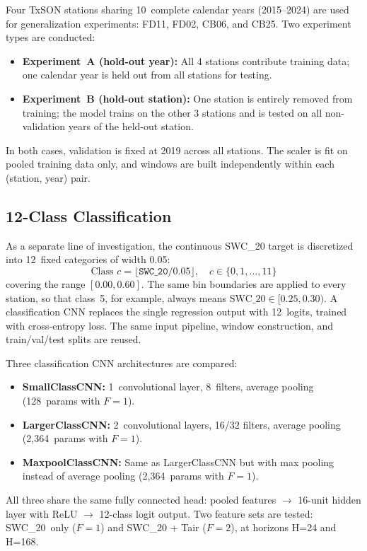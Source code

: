 \documentclass[11pt]{article}
\begin{document}
Four TxSON stations sharing 10~complete calendar years (2015--2024) are used for
generalization experiments: FD11, FD02, CB06, and CB25. Two experiment types are
conducted:
\begin{itemize}
    \item \textbf{Experiment~A (hold-out year):} All 4 stations contribute training
    data; one calendar year is held out from all stations for testing.
    \item \textbf{Experiment~B (hold-out station):} One station is entirely removed
    from training; the model trains on the other 3 stations and is tested on all
    non-validation years of the held-out station.
\end{itemize}
In both cases, validation is fixed at 2019 across all stations. The scaler is fit on
pooled training data only, and windows are built independently within each
(station, year) pair.

\subsection{12-Class Classification}

As a separate line of investigation, the continuous SWC\_20 target is discretized
into 12~fixed categories of width 0.05:
\begin{equation}
    \text{Class } c = \lfloor \texttt{SWC\_20} / 0.05 \rfloor, \quad c \in \{0, 1, \ldots, 11\}
\end{equation}
covering the range $[0.00, 0.60]$. The same bin boundaries are applied to every
station, so that class~5, for example, always means
$\text{SWC\_20} \in [0.25, 0.30)$. A classification CNN replaces the single
regression output with 12~logits, trained with cross-entropy loss. The same input
pipeline, window construction, and train/val/test splits are reused.

Three classification CNN architectures are compared:
\begin{itemize}
    \item \textbf{SmallClassCNN:} 1~convolutional layer, 8~filters, average pooling
    (128~params with $F=1$).
    \item \textbf{LargerClassCNN:} 2~convolutional layers, 16/32 filters, average
    pooling (2{,}364~params with $F=1$).
    \item \textbf{MaxpoolClassCNN:} Same as LargerClassCNN but with max pooling
    instead of average pooling (2{,}364~params with $F=1$).
\end{itemize}
All three share the same fully connected head: pooled features $\to$ 16-unit hidden
layer with ReLU $\to$ 12-class logit output. Two feature sets are tested:
SWC\_20~only ($F=1$) and SWC\_20 + Tair ($F=2$), at horizons H=24 and H=168.
\end{document}
